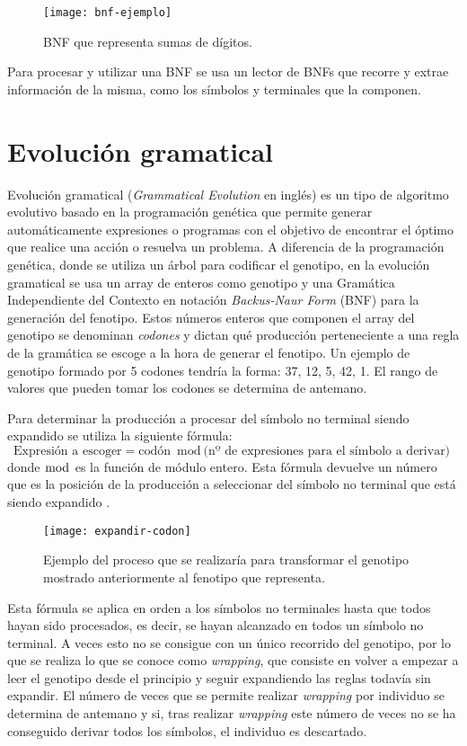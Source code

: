 \begin{figure}[H]
\centering
\texttt{[image: bnf-ejemplo]}
\caption{BNF que representa sumas de dígitos.}
\end{figure}

Para procesar y utilizar una BNF se usa un lector de BNFs que recorre y extrae información de la misma, como los símbolos y terminales que la componen.

\section{Evolución gramatical}
Evolución gramatical (\textit{Grammatical Evolution} en inglés) es un tipo de algoritmo evolutivo basado en la programación genética que permite generar automáticamente expresiones o programas  con el objetivo de encontrar el óptimo que realice una acción o resuelva un problema. A diferencia de la programación genética, donde se utiliza un árbol para codificar el genotipo, en la evolución gramatical se usa un array de enteros como genotipo y una Gramática Independiente del Contexto en notación \textit{Backus-Naur Form} (BNF) para la generación del fenotipo. Estos números enteros que componen el array del genotipo se denominan \textit{codones} y dictan qué producción perteneciente a una regla de la gramática se escoge a la hora de generar el fenotipo. Un ejemplo de genotipo formado por 5 codones tendría la forma: 37, 12, 5, 42, 1. El rango de valores que pueden tomar los codones se determina de antemano.

Para determinar la producción a procesar del símbolo no terminal siendo expandido se utiliza la siguiente fórmula:
\begin{equation}
\textrm{Expresión a escoger} = \textrm{codón} \bmod \textrm{(nº de expresiones para el símbolo a derivar)}
\end{equation}
donde $\bmod$ es la función de módulo entero. Esta fórmula devuelve un número que es la posición de la producción a seleccionar del símbolo no terminal que está siendo expandido \cite{o2012grammatical}.

\begin{figure}[H]
\centering
\texttt{[image: expandir-codon]}
\caption{Ejemplo del proceso que se realizaría para transformar el genotipo mostrado anteriormente al fenotipo que representa.}
\end{figure}

Esta fórmula se aplica en orden a los símbolos no terminales hasta que todos hayan sido procesados, es decir, se hayan alcanzado en todos un símbolo no terminal. A veces esto no se consigue con un único recorrido del genotipo, por lo que se realiza lo que se conoce como \textit{wrapping}, que consiste en  volver a empezar a leer el genotipo desde el principio y seguir expandiendo las reglas todavía sin expandir. El número de veces que se permite realizar \textit{wrapping} por individuo se determina de antemano y si, tras realizar \textit{wrapping} este número de veces no se ha conseguido derivar todos los símbolos, el individuo es descartado.

